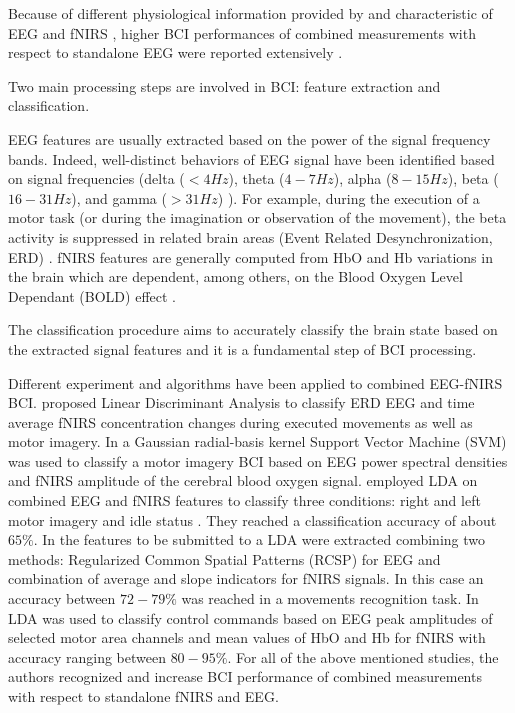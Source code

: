 \documentclass[12pt ]{iopart}
\begin{document}
Because of different physiological information provided by and characteristic of EEG and fNIRS \parencite{croce2016eeg}, higher BCI performances  of combined measurements with respect to standalone EEG were reported extensively \parencite{buccino2016hybrid, lee2014hybrid, fazli2012enhanced}.

Two main processing steps are involved in BCI:  feature extraction and classification. 

EEG features are usually extracted based on the power of the signal frequency bands. Indeed, well-distinct behaviors of EEG signal have been identified based on signal frequencies (delta ($< 4 Hz$), theta ($4-7 Hz$), alpha ($8-15 Hz$), beta ($16-31 Hz$), and gamma ($> 31 Hz$) \parencite{wolpaw2002brain}). For example, during the execution of a motor task (or during the imagination or observation of the movement), the beta activity is suppressed in related brain areas (Event Related Desynchronization, ERD) \parencite{neuper2006erd}.  
fNIRS  features are generally  computed from  HbO and Hb variations in the brain which are dependent, among others, on the  Blood Oxygen Level Dependant (BOLD) effect \parencite{naseer2015fnirs}. 

The classification procedure aims to accurately classify the brain state  based on the extracted signal features  and it is a fundamental step of BCI processing.

Different  experiment and algorithms have been applied  to combined EEG-fNIRS BCI. \textcite{Fazli_2012} proposed Linear Discriminant Analysis to classify ERD EEG and time average fNIRS concentration changes during executed movements as well as motor imagery.  In \textcite{ma2012hybrid} a Gaussian radial-basis kernel Support Vector Machine (SVM) was used to classify a motor imagery BCI based on EEG power spectral densities and fNIRS amplitude of the cerebral blood oxygen signal.   \textcite{lee2014hybrid} employed LDA on combined EEG and fNIRS features to classify three conditions: right and left motor imagery and idle status . They reached a classification accuracy of about $65\%$. In \textcite{buccino2016hybrid} the features to be submitted to a LDA were extracted combining two methods: Regularized Common Spatial Patterns (RCSP) for EEG and combination of average and slope indicators for fNIRS signals. In this case an accuracy between $72-79\%$ was reached in a movements recognition task. In  \textcite{khan2014decoding, khan2017hybrid} LDA was used to classify control commands based on EEG peak amplitudes of selected motor area channels and mean values of HbO and Hb for fNIRS with accuracy ranging between $80-95\%$.
For all of the above mentioned studies, the authors recognized and increase BCI performance of combined measurements with respect to standalone fNIRS and EEG.
\end{document}
